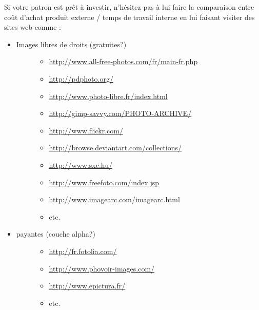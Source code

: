 \documentclass[a4paper,12pt,french]{sphinxmanual}
\begin{document}
Si votre patron est prêt à investir, n'hésitez pas à lui faire la comparaison entre coût d'achat produit externe / temps de travail interne en lui faisant visiter des sites web comme :
\begin{itemize}
\item {} \begin{description}
\item[{Images libres de droits (gratuites?)}] \leavevmode\begin{itemize}
\item {} 
\url{http://www.all-free-photos.com/fr/main-fr.php}

\item {} 
\url{http://pdphoto.org/}

\item {} 
\url{http://www.photo-libre.fr/index.html}

\item {} 
\url{http://gimp-savvy.com/PHOTO-ARCHIVE/}

\item {} 
\url{http://www.flickr.com/}

\item {} 
\url{http://browse.deviantart.com/collections/}

\item {} 
\url{http://www.sxc.hu/}

\item {} 
\url{http://www.freefoto.com/index.jsp}

\item {} 
\url{http://www.imagearc.com/imagearc.html}

\item {} 
etc.

\end{itemize}

\end{description}

\item {} \begin{description}
\item[{payantes (couche alpha?)}] \leavevmode\begin{itemize}
\item {} 
\url{http://fr.fotolia.com/}

\item {} 
\url{http://www.phovoir-images.com/}

\item {} 
\url{http://www.epictura.fr/}

\item {} 
etc.

\end{itemize}

\end{description}

\end{itemize}
\begin{quote}
\label{psd/prepa-image_su+psd:prepa-image-su-psd}\end{quote}
\end{document}
